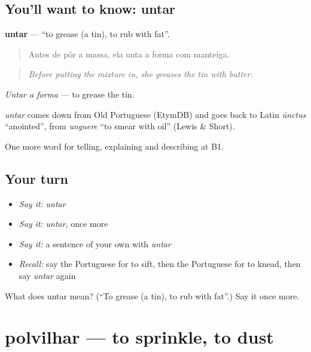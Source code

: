 \subsection*{You'll want to know: untar}
\textbf{untar} — \textquotedblleft{}to grease (a tin), to rub with fat\textquotedblright{}.

\begin{quote}
Antes de pôr a massa, ela unta a forma com manteiga.
\end{quote}

\begin{quote}
\emph{Before putting the mixture in, she greases the tin with butter.}
\end{quote}

\emph{Untar a forma} — to grease the tin.

\begin{cousinweb}
\emph{untar} comes down from Old Portuguese (EtymDB) and goes back to Latin \emph{ūnctus} \textquotedblleft{}anointed\textquotedblright{}, from \emph{unguere} \textquotedblleft{}to smear with oil\textquotedblright{} (Lewis \& Short).
\end{cousinweb}

\begin{grammarlens}[title={What you've built}]
One more word for telling, explaining and describing at B1.
\end{grammarlens}

\subsection*{Your turn}
\begin{itemize}
\raggedright
  \item \emph{Say it:} \emph{untar}
  \item \emph{Say it:} \emph{untar}, once more
  \item \emph{Say it:} a sentence of your own with \emph{untar}
  \item \emph{Recall:} say the Portuguese for to sift, then the Portuguese for to knead, then say \emph{untar} again
\end{itemize}

\begin{tcolorbox}[breakable,colback=teal!4,colframe=teal!35!black,title={Before you move on}]
What does untar mean? (\textquotedblleft{}To grease (a tin), to rub with fat\textquotedblright{}.) Say it once more.
\end{tcolorbox}
\section[polvilhar]{polvilhar — to sprinkle, to dust}

